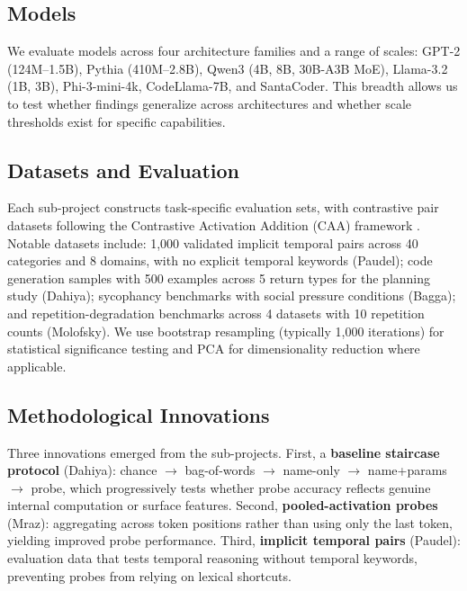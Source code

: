 \documentclass[midterm]{sparreport}
\begin{document}
\subsection{Models}

We evaluate models across four architecture families and a range of scales: GPT-2 (124M--1.5B), Pythia (410M--2.8B), Qwen3 (4B, 8B, 30B-A3B MoE), Llama-3.2 (1B, 3B), Phi-3-mini-4k, CodeLlama-7B, and SantaCoder. This breadth allows us to test whether findings generalize across architectures and whether scale thresholds exist for specific capabilities.

\subsection{Datasets and Evaluation}

Each sub-project constructs task-specific evaluation sets, with contrastive pair datasets following the Contrastive Activation Addition (CAA) framework \cite{rimsky2024steering}. Notable datasets include: 1,000 validated implicit temporal pairs across 40 categories and 8 domains, with no explicit temporal keywords (Paudel); code generation samples with 500 examples across 5 return types for the planning study (Dahiya); sycophancy benchmarks with social pressure conditions (Bagga); and repetition-degradation benchmarks across 4 datasets with 10 repetition counts (Molofsky). We use bootstrap resampling (typically 1,000 iterations) for statistical significance testing and PCA for dimensionality reduction where applicable.

\subsection{Methodological Innovations}

Three innovations emerged from the sub-projects. First, a \textbf{baseline staircase protocol} (Dahiya): chance $\to$ bag-of-words $\to$ name-only $\to$ name+params $\to$ probe, which progressively tests whether probe accuracy reflects genuine internal computation or surface features. Second, \textbf{pooled-activation probes} (Mraz): aggregating across token positions rather than using only the last token, yielding improved probe performance. Third, \textbf{implicit temporal pairs} (Paudel): evaluation data that tests temporal reasoning without temporal keywords, preventing probes from relying on lexical shortcuts.

\end{document}
